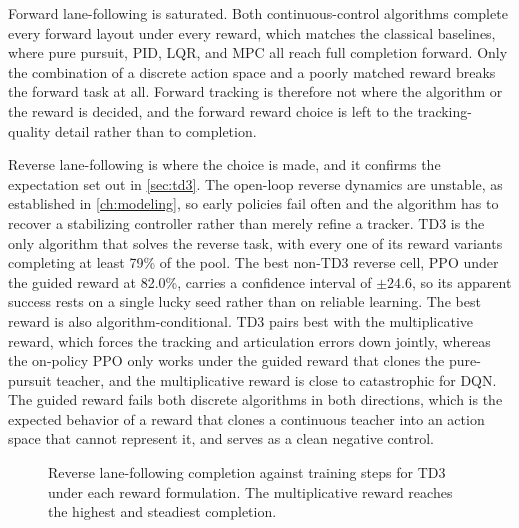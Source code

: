 


Forward lane-following is saturated. Both continuous-control algorithms complete every forward layout under every reward, which matches the classical baselines, where pure pursuit, PID, LQR, and MPC all reach full completion forward. Only the combination of a discrete action space and a poorly matched reward breaks the forward task at all. Forward tracking is therefore not where the algorithm or the reward is decided, and the forward reward choice is left to the tracking-quality detail rather than to completion.

Reverse lane-following is where the choice is made, and it confirms the expectation set out in \cref{sec:td3}. The open-loop reverse dynamics are unstable, as established in \cref{ch:modeling}, so early policies fail often and the algorithm has to recover a stabilizing controller rather than merely refine a tracker. TD3 is the only algorithm that solves the reverse task, with every one of its reward variants completing at least 79\% of the pool. The best non-TD3 reverse cell, PPO under the guided reward at 82.0\%, carries a confidence interval of $\pm 24.6$, so its apparent success rests on a single lucky seed rather than on reliable learning. The best reward is also algorithm-conditional. TD3 pairs best with the multiplicative reward, which forces the tracking and articulation errors down jointly, whereas the on-policy PPO only works under the guided reward that clones the pure-pursuit teacher, and the multiplicative reward is close to catastrophic for DQN. The guided reward fails both discrete algorithms in both directions, which is the expected behavior of a reward that clones a continuous teacher into an action space that cannot represent it, and serves as a clean negative control.

\begin{figure}[H]
    \centering
    \caption{Reverse lane-following completion against training steps for TD3 under each reward formulation. The multiplicative reward reaches the highest and steadiest completion.}
    \label{fig:reverse_reward_ablation}
\end{figure}

